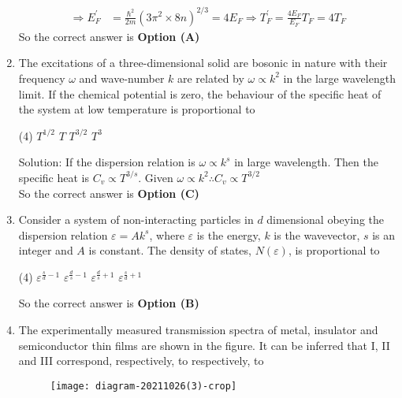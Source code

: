 \begin{enumerate}
\begin{answer}
\begin{align*}
\Rightarrow E_{F}^{\prime}&=\frac{\hbar^{2}}{2 m}\left(3 \pi^{2} \times 8 n\right)^{2 / 3}=4 E_{F} \Rightarrow T_{F}^{\prime}=\frac{4 E_{F}}{E_{F}} T_{F}=4 T_{F}
\end{align*}
So the correct answer is \textbf{Option (A)}
\end{answer}
	\item The excitations of a three-dimensional solid are bosonic in nature with their frequency $\omega$ and wave-number $k$ are related by $\omega \propto k^{2}$ in the large wavelength limit. If the chemical potential is zero, the behaviour of the specific heat of the system at low temperature is proportional to
	{}
\begin{tasks}(4)
\task[\textbf{A.}]  $T^{1 / 2}$
\task[\textbf{B.}] $T$
\task[\textbf{C.}] $T^{3 / 2}$
\task[\textbf{D.}] $T^{3}$
\end{tasks}
\begin{answer}$\left. \right. $\\
Solution: If the dispersion relation is $\omega \propto k^{s}$ in large wavelength. Then the specific heat is $C_{v} \propto T^{3 / s}$. Given $\omega \propto k^{2} \therefore C_{v} \propto T^{3 / 2}$\\
So the correct answer is \textbf{Option (C)}
\end{answer}
	\item Consider a system of non-interacting particles in $d$ dimensional obeying the dispersion relation $\varepsilon=A k^{s}$, where $\varepsilon$ is the energy, $k$ is the wavevector, $s$ is an integer and $A$ is constant. The density of states, $N(\varepsilon)$, is proportional to
	{}
\begin{tasks}(4)
\task[\textbf{A.}] $\varepsilon^{\frac{s}{d}-1}$
\task[\textbf{B.}] $\varepsilon^{\frac{d}{s}-1}$
\task[\textbf{C.}] $\varepsilon^{\frac{d}{s}+1}$
\task[\textbf{D.}] $\varepsilon^{\frac{s}{d}+1}$
\end{tasks}
\begin{answer}
So the correct answer is \textbf{Option (B)}
\end{answer}
	\item The experimentally measured transmission spectra of metal, insulator and semiconductor thin films are shown in the figure. It can be inferred that I, II and III correspond, respectively, to
	respectively, to
	{}
\begin{figure}[H]
\centering
\texttt{[image: diagram-20211026(3)-crop]}

\end{figure}
\end{enumerate}
